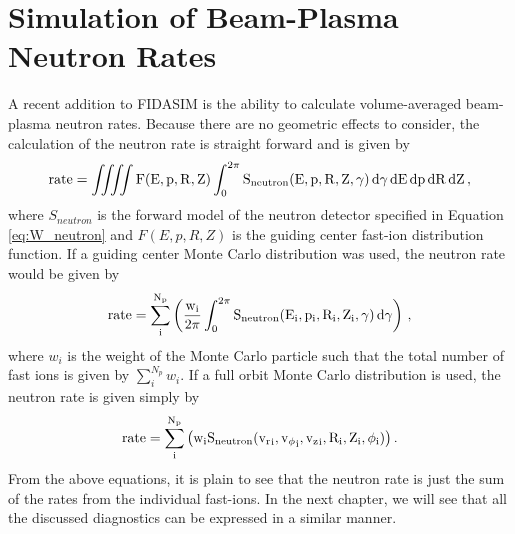 \section{Simulation of Beam-Plasma Neutron Rates}
A recent addition to FIDASIM is the ability to calculate volume-averaged beam-plasma neutron rates. Because there are no geometric effects to consider, the calculation of the neutron rate is straight forward and is given by
\begin{equation}\label{eq:neutron_rate_f}
    \rm{rate} = \iiiint F(E,p,R,Z) \int_0^{2\pi} S_{neutron}(E,p,R,Z,\gamma) \,d\gamma\,dE\,dp\,dR\,dZ\,,
\end{equation}
where $S_{neutron}$ is the forward model of the neutron detector specified in Equation \ref{eq:W_neutron} and $F(E,p,R,Z)$ is the guiding center fast-ion distribution function.
If a guiding center Monte Carlo distribution was used, the neutron rate would be given by
\begin{equation}\label{eq:neutron_rate_gcmc}
    \rm{rate} = \sum_i^{N_p}\left (\frac{w_i}{2\pi} \int_0^{2\pi}  S_{neutron}(E_i,p_i,R_i,Z_i,\gamma) \,d\gamma \right )\,,
\end{equation}
where $w_i$ is the weight of the Monte Carlo particle such that the total number of fast ions is given by $\sum_i^{N_p} w_i$. If a full orbit Monte Carlo distribution is used, the neutron rate is given simply by
\begin{equation}\label{eq:neutron_rate_fomc}
    \rm{rate} = \sum_i^{N_p}\left (w_i S_{neutron}({v_r}_i,{v_\phi}_i,{v_z}_i,R_i,Z_i,\phi_i) \right ).
\end{equation}
From the above equations, it is plain to see that the neutron rate is just the sum of the rates from the individual fast-ions. In the next chapter, we will see that all the discussed diagnostics can be expressed in a similar manner.